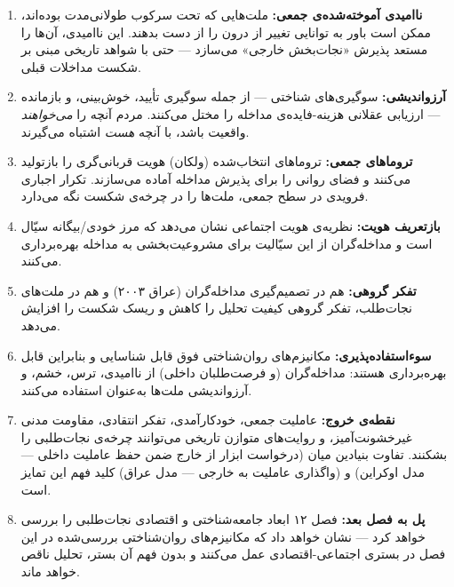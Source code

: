 \begin{tcolorbox}[wavebox, title={یافته‌های کلیدی فصل ۱۱}]
\begin{enumerate}
\item \textbf{ناامیدی آموخته‌شده‌ی جمعی:} ملت‌هایی که تحت سرکوب طولانی‌مدت بوده‌اند، ممکن است باور به توانایی تغییر از درون را از دست بدهند. این ناامیدی، آن‌ها را مستعد پذیرش «نجات‌بخش خارجی» می‌سازد — حتی با شواهد تاریخی مبنی بر شکست مداخلات قبلی.

\item \textbf{آرزواندیشی:} سوگیری‌های شناختی — از جمله سوگیری تأیید، خوش‌بینی، و بازمانده — ارزیابی عقلانی هزینه-فایده‌ی مداخله را مختل می‌کنند. مردم آنچه را \textit{می‌خواهند} واقعیت باشد، با آنچه \textit{هست} اشتباه می‌گیرند.

\item \textbf{تروماهای جمعی:} تروماهای انتخاب‌شده (ولکان) هویت قربانی‌گری را بازتولید می‌کنند و فضای روانی را برای پذیرش مداخله آماده می‌سازند. تکرار اجباری فرویدی در سطح جمعی، ملت‌ها را در چرخه‌ی شکست نگه می‌دارد.

\item \textbf{بازتعریف هویت:} نظریه‌ی هویت اجتماعی نشان می‌دهد که مرز خودی/بیگانه سیّال است و مداخله‌گران از این سیّالیت برای مشروعیت‌بخشی به مداخله بهره‌برداری می‌کنند.

\item \textbf{تفکر گروهی:} هم در تصمیم‌گیری مداخله‌گران (عراق ۲۰۰۳) و هم در ملت‌های نجات‌طلب، تفکر گروهی کیفیت تحلیل را کاهش و ریسک شکست را افزایش می‌دهد.

\item \textbf{سوءاستفاده‌پذیری:} مکانیزم‌های روان‌شناختی فوق قابل شناسایی و بنابراین قابل بهره‌برداری هستند: مداخله‌گران (و فرصت‌طلبان داخلی) از ناامیدی، ترس، خشم، و آرزواندیشی ملت‌ها به‌عنوان  استفاده می‌کنند.

\item \textbf{نقطه‌ی خروج:} عاملیت جمعی، خودکارآمدی، تفکر انتقادی، مقاومت مدنی غیرخشونت‌آمیز، و روایت‌های متوازن تاریخی می‌توانند چرخه‌ی نجات‌طلبی را بشکنند. تفاوت بنیادین میان  (درخواست ابزار از خارج ضمن حفظ عاملیت داخلی — مدل اوکراین) و  (واگذاری عاملیت به خارجی — مدل عراق) کلید فهم این تمایز است.

\item \textbf{پل به فصل بعد:} فصل ۱۲ ابعاد جامعه‌شناختی و اقتصادی نجات‌طلبی را بررسی خواهد کرد — نشان خواهد داد که مکانیزم‌های روان‌شناختی بررسی‌شده در این فصل در بستری اجتماعی-اقتصادی عمل می‌کنند و بدون فهم آن بستر، تحلیل ناقص خواهد ماند.
\end{enumerate}
\end{tcolorbox}

